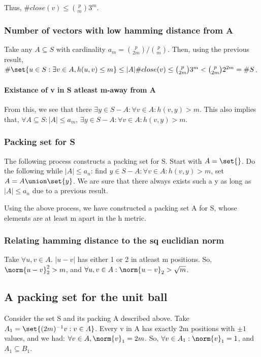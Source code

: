 \documentclass{article}
\begin{document}
Thus, $\#close(v) \leq \binom{p}{m} 3^{m}$.

\subsubsection{Number of vectors with low hamming distance from A}
Take any $A \subseteq S$ with cardinality $a_m = \binom{p}{2m}/ \binom{p}{m}$. Then, using the previous result, \\
$\#\set{u \in S: \exists v \in A, h(u, v) \leq m} \leq |A|\#close(v) \leq  \binom{p}{2m} 3^{m} < \binom{p}{2m} 2^{2m} = \#S$.

\paragraph*{Existance of v in S atleast m-away from A}
From this, we see that there $\exists y \in S-A: \forall v \in A: h(v, y) > m$. This also implies that, $\forall A \subseteq S: |A| \leq a_m$, $\exists y \in S-A: \forall v \in A: h(v, y) > m$.

\subsubsection{Packing set for S}
The following process constructs a packing set for S. Start with $A = \set{}$. Do the following while $|A| \leq a_n$: find $y\in S-A: \forall v \in A: h(v, y) > m$, set $A = A \union \set{y}$. We are sure that there always exists such a y as long as $|A| \leq a_n$ due to a previous result.

Using the above process, we have constructed a packing set A for S, whose elements are at least m apart in the h metric.

\subsubsection{Relating hamming distance to the sq euclidian norm}
Take $\forall u, v \in A$. $|u-v|$ has either 1 or 2 in atleast m positions. So, $\norm{u-v}_2^{2} > m$, and $\forall u, v \in A: \norm{u-v}_2 > \sqrt{m}$.

\subsection{A packing set for the unit ball}
Consider the set S and its packing A described above. Take \\
$A_1 = \set{(2m)^{-1}v: v \in A}$. Every v in A has exactly 2m positions with $\pm 1$ values, and we had: $\forall v\in A, \norm{v}_1 = 2m$. So, $\forall v \in A_1: \norm{v}_1 = 1$, and $A_1 \subseteq B_1$.
\end{document}
